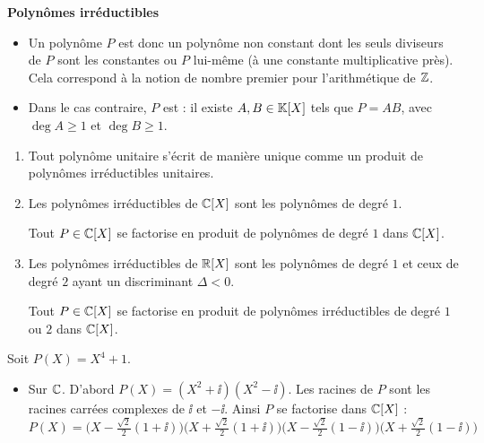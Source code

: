 \documentclass[10pt,class=article,crop=false]{standalone}
\begin{document}
\begin{multicols}{2}
\textbf{Polynômes irréductibles}
\begin{itemize}
	\item Un polynôme  $P$ est donc un polynôme non constant
	dont les seuls diviseurs de $P$ sont les constantes ou $P$ lui-même
	(à une constante multiplicative près).
	Cela correspond à la notion de nombre premier pour l'arithmétique de $\mathbb{Z}$.
	
	\item Dans le cas contraire, $P$ est  :
	il existe  $A, B \in \mathbb{K}[X]$ tels que $P=AB$, avec
	$\deg A \ge 1$ et  $\deg B \ge 1$.
\end{itemize}





\begin{theoreme}
\sauteligne	
\begin{enumerate}
	\item Tout polynôme unitaire s'écrit de manière unique comme un produit de polynômes irréductibles unitaires.
	
    \item Les polynômes irréductibles de $\mathbb{C}[X]$ sont les polynômes de degré $1$.
	
	Tout $P\in\mathbb{C}[X]$ se factorise en produit de polynômes de degré $1$ dans $\mathbb{C}[X]$.

	\item Les polynômes irréductibles de $\mathbb{R}[X]$
	sont les polynômes de degré $1$ et ceux de degré $2$ ayant
	un discriminant $\Delta<0$.
	
	Tout $P\in\mathbb{C}[X]$ se factorise en produit de polynômes irréductibles de degré $1$ ou $2$ dans $\mathbb{C}[X]$.	
\end{enumerate}
\end{theoreme}



\begin{exemple}
Soit $P(X)=X^4+1$.
\begin{itemize}
	\item Sur $\mathbb{C}$. D'abord $P(X)=(X^2+\ii)(X^2-\ii)$.
	Les racines de $P$ sont les racines carrées complexes de $\ii$ et $-\ii$.
	Ainsi $P$ se factorise dans $\mathbb{C}[X]$ :
	$$P(X)=\big(X-\tfrac{\sqrt2}{2}(1+\ii)\big)\big(X+\tfrac{\sqrt2}{2}(1+\ii)\big)\big(X-\tfrac{\sqrt2}{2}(1-\ii)\big)
	\big(X+\tfrac{\sqrt2}{2}(1-\ii)\big)$$
	

\end{itemize}
\end{exemple}
\end{multicols}
\end{document}

